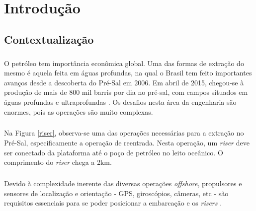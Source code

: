 


\chapter{Introdução}

\label{CapIntro}



\section{Contextualização}

\paragraph{} O petróleo tem importância econômica global. Uma das formas de extração do mesmo é aquela feita em águas profundas, na qual o Brasil tem feito importantes avanços desde a descoberta do Pré-Sal em 2006. Em abril de 2015, chegou-se à produção de mais de 800 mil barris por dia no pré-sal, com campos situados em águas profundas e ultraprofundas \cite{preSal}. Os desafios nesta área da engenharia são enormes, pois as operações são muito complexas.

\paragraph{} Na Figura \ref{riser}, observa-se uma das operações necessárias para a extração no Pré-Sal, especificamente a operação de reentrada. Nesta operação, um \textit{riser} deve ser conectado da plataforma até o poço de petróleo no leito oceânico. O comprimento do \textit{riser} chega a 2km.

\paragraph{} Devido à complexidade inerente das diversas operações \textit{offshore}, propulsores e sensores de localização e orientação - GPS, giroscópios, câmeras, etc - são requisitos essenciais para se poder posicionar a embarcação e os \textit{risers} \cite{redytton}.

